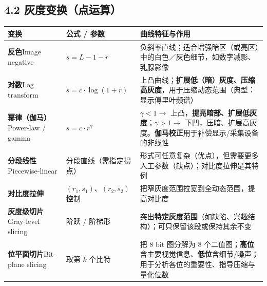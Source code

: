 \subsection*{4.2 灰度变换（点运算）}
\begin{center}\small\renewcommand{\arraystretch}{1.25}
\begin{tabularx}{\linewidth}{|>{\centering\arraybackslash}p{.16\linewidth}|p{.24\linewidth}|X|}\hline
\textbf{变换}&\centering\textbf{公式 / 参数}&\centering\arraybackslash\textbf{曲线特征与作用}\\\hline
\textbf{反色}\newline Image negative&$s=L-1-r$&负斜率直线；适合增强暗区（或亮区）中的白色／灰色细节，如数字减影、乳腺影像\\\hline
\textbf{对数}\newline Log transform&$s=c\cdot\log(1+r)$&上凸曲线；\textbf{扩展低（暗）灰度、压缩高灰度}，用于压缩动态范围（典型：显示傅里叶频谱）\\\hline
\textbf{幂律（伽马）}\newline Power-law / gamma&$s=c\cdot r^\gamma$&$\gamma<1\to$ 上凸，\textbf{提亮暗部、扩展低灰度}；$\gamma>1\to$ 下凹，压暗、扩展高灰度。\textbf{伽马校正}用于补偿显示/采集设备的非线性\\\hline
\textbf{分段线性}\newline Piecewise-linear&分段直线（需指定拐点）&形式可任意复杂（优点），但需要更多人工参数（缺点）；对比度拉伸是其特例\\\hline
\textbf{对比度拉伸}&$(r_1,s_1)$、$(r_2,s_2)$ 控制&把窄灰度范围拉宽到全动态范围，提高对比度\\\hline
\textbf{灰度级切片}\newline Gray-level slicing&阶跃 / 阶梯形&突出\textbf{特定灰度范围}（如缺陷、兴趣结构）；可只保留该段或保持其余不变\\\hline
\textbf{位平面切片}\newline Bit-plane slicing&取第 $k$ 个比特&把 8 bit 图分解为 8 个二值图；\textbf{高位}含主要视觉信息、\textbf{低位}含细节/噪声；用于分析各位的重要性、指导压缩与量化位数\\\hline
\end{tabularx}\end{center}
